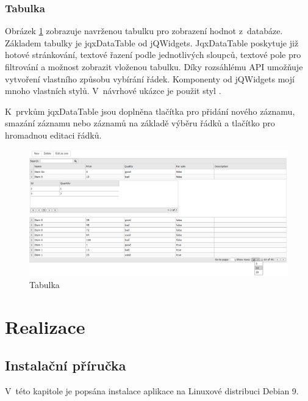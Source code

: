 \documentclass[thesis=B,czech]{FITthesis}[2012/06/26]
\begin{document}
\subsection{Tabulka}
	Obrázek \ref{tabulka} zobrazuje navrženou tabulku pro zobrazení hodnot z~databáze. Základem tabulky je jqxDataTable\cite{jqx_dataTable} od jQWidgets. JqxDataTable poskytuje již hotové stránkování, textové řazení podle jednotlivých sloupců, textové pole pro filtrování a možnost zobrazit vloženou tabulku. Díky rozsáhlému API umožňuje vytvoření vlastního způsobu vybírání řádek. Komponenty od jQWidgets mojí mnoho vlastních stylů. V~návrhové ukázce je použit styl .
	
	K~prvkům jqxDataTable jsou doplněna tlačítka pro přidání nového záznamu, smazání záznamu nebo záznamů na základě výběru řádků a tlačítko pro hromadnou editaci řádků.

\begin{figure}
	\includegraphics[width=500pt, height=0.8\textwidth, angle=90]{data_table.png}
	\caption{Tabulka}\label{tabulka}
\end{figure}
	

\chapter{Realizace}

\section{Instalační příručka}
	V~této kapitole je popsána instalace aplikace na Linuxové distribuci Debian 9.
\end{document}
